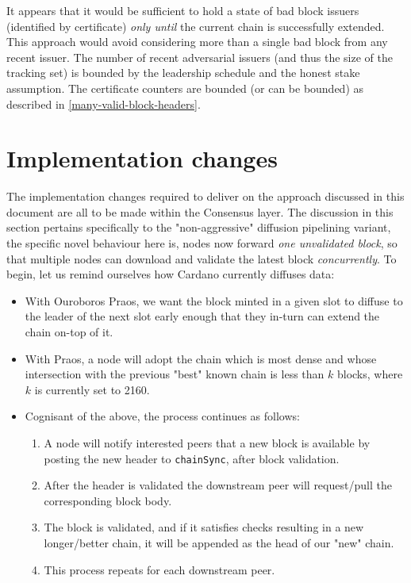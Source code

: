 \documentclass[11pt,a4paper]{article}
\begin{document}
It appears that it would be sufficient to hold a state of bad block issuers
(identified by certificate) \emph{only until} the current chain is successfully
extended. This approach would avoid considering more than a single bad block from any
recent issuer. The number of recent adversarial issuers (and thus the size of
the tracking set) is bounded by the leadership schedule and the honest stake
assumption. The certificate counters are bounded (or can be bounded) as
described in \cref{many-valid-block-headers}.

\pagebreak

\section{Implementation changes}
The implementation changes required to deliver on the approach discussed in this document
are all to be made within the Consensus layer. The discussion in this section pertains specifically 
to the "non-aggressive" diffusion pipelining variant, the specific novel behaviour here is, nodes now
forward \emph{one unvalidated block}, so that multiple nodes can download and validate the latest 
block \emph{concurrently}. To begin, let us remind ourselves how Cardano currently diffuses data:

\begin{itemize}
  \item With Ouroboros Praos, we want the block minted in a given slot to diffuse to the leader of the next slot early enough that they in-turn can extend the chain on-top of it.
  \item With Praos, a node will adopt the chain which is most dense and whose intersection with the previous "best" known chain is less than $k$ blocks, where $k$ is currently set to 2160.
  \item Cognisant of the above, the process continues as follows:
  \begin{enumerate}
    \item A node will notify interested peers that a new block is available by posting the new header to \lstinline{chainSync}, after block validation. 
    \item After the header is validated the downstream peer will request/pull the corresponding block body.
    \item The block is validated, and if it satisfies checks resulting in a new longer/better chain, it will be appended as the head of our "new" chain.
    \item This process repeats for each downstream peer.
  \end{enumerate}
\end{itemize}
\end{document}
